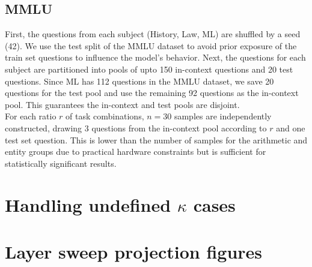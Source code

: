 \documentclass[11pt]{article}
\begin{document}
\subsection*{MMLU}
First, the questions from each subject (History, Law, ML) are shuffled by a seed (42). We use the test split of the MMLU dataset to avoid prior exposure of the train set questions to influence the model's behavior. Next, the questions for each subject are partitioned into pools of upto 150 in-context questions and 20 test questions. Since ML has 112 questions in the MMLU dataset, we save 20 questions for the test pool and use the remaining 92 questions as the in-context pool. This guarantees the in-context and test pools are disjoint. \\[1em]
For each ratio \(r\) of task combinations, \(n = 30\) samples are independently constructed, drawing 3 questions from the in-context pool according to \(r\) and one test set question. This is lower than the number of samples for the arithmetic and entity groups due to practical hardware constraints but is sufficient for statistically significant results.

\section{Handling undefined \(\kappa\) cases}
\label{appendix:kappa_edge}

\section{Layer sweep projection figures}
\label{appendix:layer_sweep}
\end{document}
